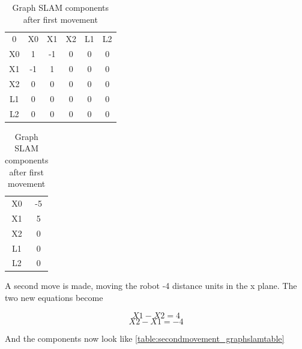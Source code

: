 \documentclass[Main]{subfiles}
\begin{document}
\begin{table}[H]
	\begin{subtable}{0.5\linewidth}
		\centering
	\begin{tabular}{cccccc}
		0 & X0 & X1 & X2 & L1 & L2 \\ 
		X0 & 1 & -1 & 0 & 0 & 0  \\ 
		X1 & -1 & 1 & 0 & 0 & 0  \\ 
		X2 & 0 & 0 & 0 & 0 & 0  \\  
		L1 & 0 & 0 & 0 & 0 & 0  \\ 
		L2 & 0 & 0 & 0 & 0 & 0  \\ 
	\end{tabular}
	\caption{$\Omega$ }
	\end{subtable}
	\begin{subtable}{0.5\linewidth}
		\centering
		\begin{tabular}{cc}
			X0 & -5 \\ 
			X1 & 5 \\ 
			X2 & 0 \\ 
			L1 & 0 \\  
			L2 & 0 \\ 
		\end{tabular}
	\caption{$\xi$}
	\end{subtable}
\caption{Graph SLAM components after first movement}
\label{table:firstmovement_graphslamtable} 
\end{table} \noindent

A second move is made, moving the robot -4 distance units in the x plane. 
The two new equations become

	\begin{equation}
		X1 - X2 = 4
	\end{equation}
	\begin{equation}
		X2 - X1 = -4
	\end{equation}
		
And the components now look like \autoref{table:secondmovement_graphslamtable}
\end{document}
